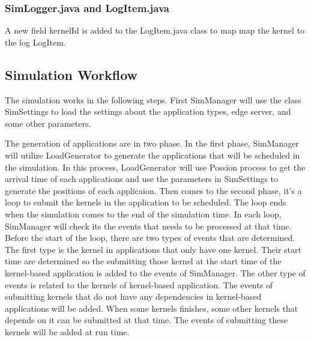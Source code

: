 \subsubsection{SimLogger.java and LogItem.java}


A new field kernelId is added to the LogItem.java class to map map the kernel to the log LogItem.


\subsection{Simulation Workflow}

The simulation works in the following steps. First SimManager will use the class SimSettings to load the settings about the application types, edge server, and some other parameters. 

The generation of applications are in two phase. In the first phase, SimManager will utilize LoadGenerator to generate the applications that will be scheduled in the simulation. In this process, LoadGenerator will use Possion process to get the arrival time of each applications and use the parameters in SimSettings to generate the positions of each applicaion. Then comes to the second phase, it's a loop to submit the kernels in the application to be scheduled. The loop ends when the simulation comes to the end of the simulation time. In each loop, SimManager will check its the events that needs to be processed at that time. Before the start of the loop, there are two types of events that are determined. The first type is the kernel in applications that only have one kernel. Their start time are determined so the submitting those kernel at the start time of the kernel-based application is added to the events of SimManager. The other type of events is related to the kernels of kernel-based application. The  events of submitting kernels that do not have any dependencies in kernel-based applications  will be added. When some kernels finishes, some other kernels that depends on it can be submitted at that time. The events of submitting these kernels will be  added at run time.

